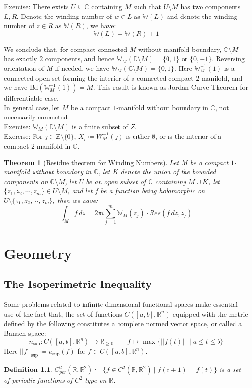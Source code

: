 \documentclass[11pt,oneside]{book}
\theoremstyle{break}
\theoremstyle{break}
\newtheorem{thm}{Theorem}[section]
\newtheorem{defn}{Definition}[corL]
\newcommand{\R}{\mathbb{R}}
\newcommand{\Z}{\mathbb{Z}}
\newcommand{\Complex}{\mathbb{C}}
\newcommand{\Bd}{\text{Bd}}
\newcommand{\exercise}{\color{green}Exercise: \color{black}}
\begin{document}
\exercise There exists $U\subseteq \Complex$ containing $M$ such that $U \setminus M$ has two components $L,R$. Denote the winding number of $w \in L$ as $\mathbb{W}(L)$ and denote the winding number of $z \in R$ as $\mathbb{W}(R)$, we have: 
$$\mathbb{W}(L) = \mathbb{W}(R)+1$$

We conclude that, for compact connected $M$ without manifold boundary, $\Complex\setminus M$ has exactly $2$ components, and hence $\mathbb{W}_M(\Complex \setminus M) = \{0,1\}$ or $\{0,-1\}$. Reversing orientation of $M$ if needed, we have $\mathbb{W}_M(\Complex \setminus M) = \{0,1\}$. Here $\mathbb{W}_M^{-1}(1)$ is a connected open set forming the interior of a connected compact $2$-manifold, and we have $\Bd(\mathbb{W}_M^{-1}(1)) = M$. This result is known as Jordan Curve Theorem for differentiable case.\\

In general case, let $M$ be a compact $1$-manifold without boundary in $\Complex$, not necessarily connected.\\
\exercise $\mathbb{W}_M(\Complex \setminus M) $ is a finite subset of $Z$. \\
\exercise For $j \in \Z\setminus \{0\}$, $X_j \coloneqq W_M^{-1}(j)$ is either $\emptyset$, or is the interior of a compact $2$-manifold in $\Complex$.\\

\begin{thm}[Residue theorem for Winding Numbers]
Let $M$ be a compact $1$-manifold without boundary in $\Complex$, let $K$ denote the union of the bounded components on $\Complex \setminus M$, let $U$ be an open subset of $\Complex$ containing $M\cup K$, let $\{z_1,z_2,\cdots, z_m\} \in U\setminus M$, and let $f$ be a function being holomorphic on $U \setminus \{z_1,z_2,\cdots, z_m\}$,  then we have:
$$\int_M f\, dz = 2\pi i \sum_{j=1}^m \mathbb{W}_M(z_j) \cdot Res(f\, dz, z_j)$$
\end{thm}
 


\newpage
\chapter{Geometry}
\setcounter{section}{40}
\section[The Isoperimetric Inequality]{\color{red}The Isoperimetric Inequality \color{black}}
Some problems related to infinite dimensional functional spaces make essential use of the fact that, the set of functions $C([a,b],\R^n)$ equipped with the metric defined by the following constitutes a complete normed vector space, or called a Banach space: $$n_{\sup}: C([a,b],\R^n) \to \R_{\geq 0} \qquad f \mapsto \max\{||f(t)||\ \mid a\leq t\leq b\}$$
Here $||f||_{\sup} \coloneqq n_{\sup}(f)$ for $f \in C([a,b],\R^n)$.
\hfill\break
\begin{defn}
$C^2_{per}(\R, \R^2) \coloneqq \{ f \in C^2(\R,\R^2)\mid f(t+1) = f(t)\}$ is a set of periodic functions of $C^2$ type on $\R$.
\end{defn}
\end{document}
